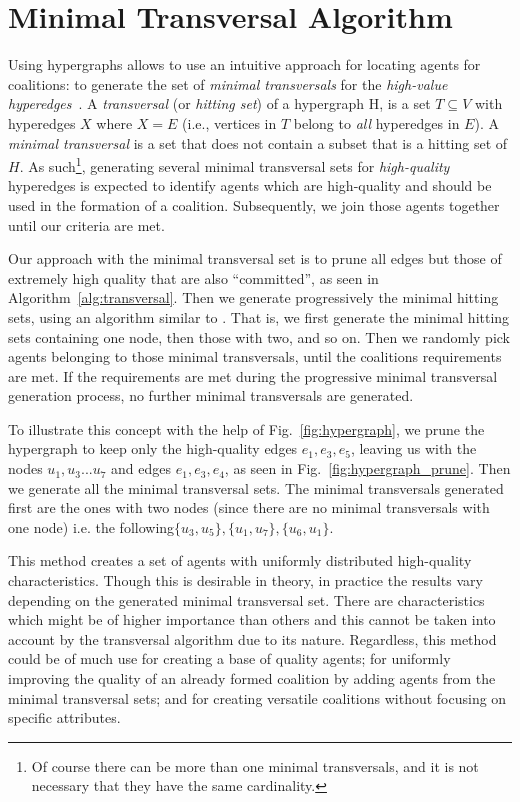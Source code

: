 \section{Minimal Transversal Algorithm} \label{sec:transversal}
Using hypergraphs allows to use an intuitive approach  for locating agents for coalitions: to generate the set of \textit{minimal transversals} for the \textit{high-value hyperedges}~\cite{eiter1995identifying}. A \textit{transversal} (or \textit{hitting set}) of a hypergraph H, is a set $T\subseteq V$ with hyperedges $X$ where $X = E$ (i.e., vertices in $T$ belong to \textit{all} hyperedges in $E$). A \textit{minimal transversal} is a set that does not contain a subset that is a hitting set of $H$.  As such\footnote{Of course there can be more than one minimal transversals, and it is not necessary that they have the same cardinality.}, generating several minimal transversal sets for \textit{high-quality} hyperedges is expected to identify agents which are high-quality and should be used in the formation of a coalition. Subsequently, we join those agents together until our criteria are met. 

Our approach with the minimal transversal set is to prune all edges but those of extremely high quality that are also ``committed'', as seen in Algorithm~\ref{alg:transversal}. Then we generate progressively the minimal hitting sets, using an algorithm similar to \cite{eiter1995identifying}. That is, we first generate the minimal hitting sets containing one node, then those with two, and so on. Then we randomly pick agents belonging to those minimal transversals, until the coalitions requirements are met. If the requirements are met during the progressive minimal transversal generation process, no further minimal transversals are generated.

To illustrate this concept with the help of Fig.~\ref{fig:hypergraph}, we prune the hypergraph to keep only the high-quality edges $e_1, e_3, e_5$, leaving us with the nodes $u_1, u_3...u_7$ and edges $e_1, e_3, e_4$, as seen in Fig.~\ref{fig:hypergraph_prune}. Then we generate all the minimal transversal sets. The minimal transversals generated first are the ones with two nodes (since there are no minimal transversals with one node) i.e. the following$\{u_3, u_5\}, \{u_1,u_7\}, \{ u_6, u_1\}$.%

This method creates a set of agents with uniformly distributed high-quality characteristics. Though this is desirable in theory, in practice the results vary depending on the generated minimal transversal set. There are characteristics which might be of higher importance than others and this cannot be taken into account by the transversal algorithm due to its nature. Regardless, this method could be of much use for creating a base of quality agents; for uniformly improving the quality of an already formed coalition by adding agents from the minimal transversal sets; and for creating versatile coalitions without focusing on specific attributes.

